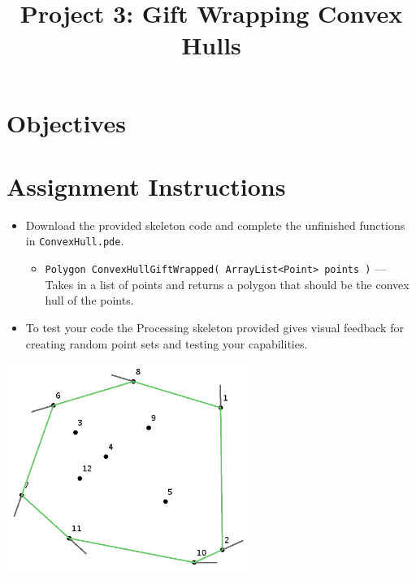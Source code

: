 \documentclass[a4paper,12pt]{article}
\title{Project 3: Gift Wrapping Convex Hulls}
\begin{document}
\maketitle

\section{Objectives}



\projectGroundRules


\vspace{5pt}
\section{Assignment Instructions}

\begin{itemize}

\item Download the provided skeleton code and complete the unfinished functions in \texttt{ConvexHull.pde}.

\begin{itemize}

   \item \texttt{Polygon ConvexHullGiftWrapped( ArrayList<Point> points )} --- Takes in a list of points and returns a polygon that should be the convex hull of the points.
   
\end{itemize}

\item To test your code the Processing skeleton provided gives visual feedback for creating random point sets and testing your capabilities.

\end{itemize}

\begin{center}
\includegraphics[width=8cm]{../images/project3.png}
\end{center}

\projectSubmission
\end{document}
